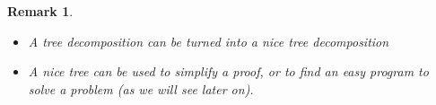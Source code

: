 \documentclass[8pt]{beamer}
\newtheorem*{remark}{Remark}
\begin{document}
\begin{frame}
\begin{definition}
\begin{tabular}{c|c|c|c}
    \end{tabular}
  \end{definition}

  \begin{remark}
    \begin{itemize}
    \item A tree decomposition can be turned into a nice tree decomposition
    \item A nice tree can be used to simplify a proof, or to find an easy program to solve a problem (as we will see later on).
    \end{itemize}
  \end{remark}
  

\end{frame}


\end{document}
